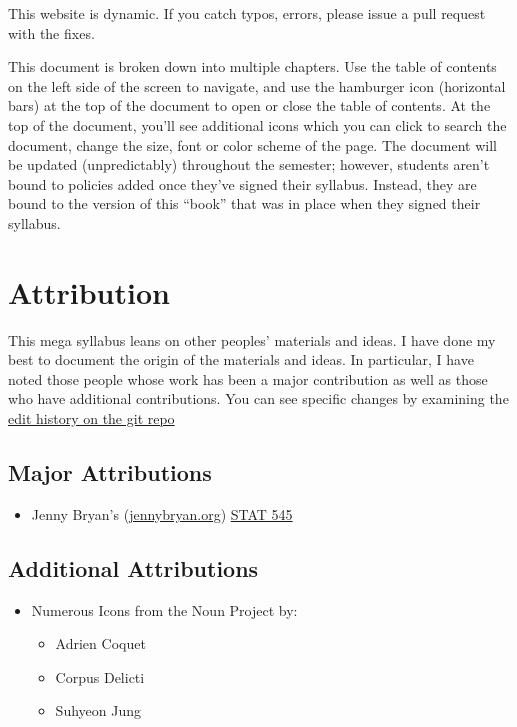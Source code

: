 This website is dynamic. If you catch typos, errors, please issue a pull request with the fixes.

This document is broken down into multiple chapters. Use the table of contents on the left side of the screen to navigate, and use the hamburger icon (horizontal bars) at the top of the document to open or close the table of contents. At the top of the document, you'll see additional icons which you can click to search the document, change the size, font or color scheme of the page. The document will be updated (unpredictably) throughout the semester; however, students aren't bound to policies added once they've signed their syllabus. Instead, they are bound to the version of this ``book'' that was in place when they signed their syllabus.

\hypertarget{attribution}{%
\chapter*{Attribution}\label{attribution}}


This mega syllabus leans on other peoples' materials and ideas. I have done my best to document the origin of the materials and ideas. In particular, I have noted those people whose work has been a major contribution as well as those who have additional contributions. You can see specific changes by examining the \href{https://github.com/smasongarrison/Syllabi/commits/main}{edit history on the git repo}

\hypertarget{major-attributions}{%
\section*{Major Attributions}\label{major-attributions}}


\begin{itemize}
\tightlist
\item
  Jenny Bryan's (\href{https://jennybryan.org}{jennybryan.org}) \href{https://stat545.com}{STAT 545}
\end{itemize}

\hypertarget{additional-attributions}{%
\section*{Additional Attributions}\label{additional-attributions}}


\begin{itemize}
\tightlist
\item
  Numerous Icons from the Noun Project by:

  \begin{itemize}
  \tightlist
  \item
    Adrien Coquet
  \item
    Corpus Delicti
  \item
    Suhyeon Jung
  \end{itemize}
\end{itemize}


